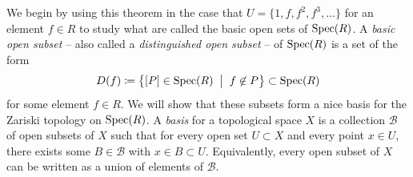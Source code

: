 \documentclass[12pt,reqno]{amsart}
\begin{document}
We begin by using this theorem in the case that $U=\{1,f,f^2,f^3,\ldots\}$ for an element $f \in R$ to study what are called the basic open sets of $\operatorname{Spec}(R)$. A \emph{basic open subset} -- also called a \emph{distinguished open subset} -- of $\operatorname{Spec}(R)$ is a set of the form
\[
D(f) \coloneqq \left\{ [P] \in \operatorname{Spec}(R) \;\; \big| \;\; f \not \in P\right\}  \subset \operatorname{Spec}(R)
\]
for some element $f\in R$. We will show that these subsets form a nice basis for the Zariski topology on $\operatorname{Spec}(R)$. A \emph{basis} for a topological space $X$ is a collection $\mathcal{B}$ of open subsets of $X$ such that for every open set $U \subset X$ and every point $x \in U$, there exists some $B \in \mathcal{B}$ with $x \in B \subset U$. Equivalently, every open subset of $X$ can be written as a union of elements of $\mathcal{B}$.


\hrulefill
\end{document}
